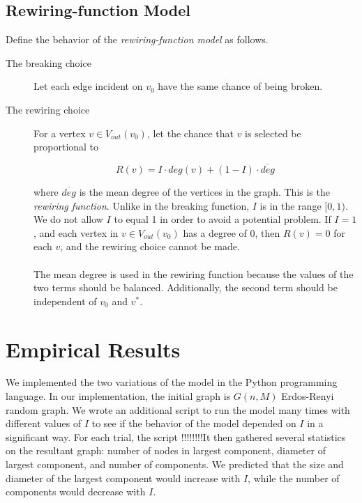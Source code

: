 \documentclass[a4paper,10pt]{article}
\begin{document}
\subsection{Rewiring-function Model}

Define the behavior of the \emph{rewiring-function model} as follows.

\begin{description}
 \item[The breaking choice] Let each edge incident on $v_0$ have the same chance of being broken.

 \item[The rewiring choice] For a vertex $v \in V_{out}(v_0)$, let the chance that $v$ is selected be proportional to

 \begin{equation}
\label{eqn:rewiring-function}
 R(v) = I \cdot deg(v) + (1 - I) \cdot \overline{deg}
 \end{equation}

where $\overline{deg}$ is the mean degree of the vertices in the graph. This is the \emph{rewiring function}. Unlike in the breaking function, $I$ is in the range $[0, 1)$. We do not allow $I$ to equal 1 in order to avoid a potential problem. If $I = 1$, and each vertex in $v \in V_{out}(v_0)$ has a degree of 0, then $R(v) = 0$ for each $v$, and the rewiring choice cannot be made. 
  
\paragraph{} The mean degree is used in the rewiring function because the values of the two terms should be balanced. Additionally, the second term should be independent of $v_0$ and $v^*$.

\end{description}

\section{Empirical Results}

We implemented the two variations of the model in the Python programming language. In our implementation, the initial graph is $G(n, M)$ Erdos-Renyi random graph. We wrote an additional script to run the model many times with different values of $I$ to see if the behavior of the model depended on $I$ in a significant way. For each trial, the script !!!!!!!!It then gathered several statistics on the resultant graph: number of nodes in largest component, diameter of largest component, and number of components. We predicted that the size and diameter of the largest component would increase with $I$, while the number of components would decrease with $I$. 
\end{document}

